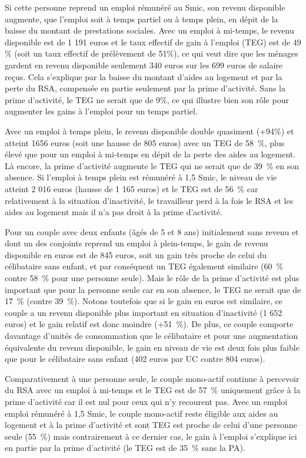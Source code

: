 \documentclass[
  french,
]{article}
\begin{document}
Si cette personne reprend un emploi rémunéré au Smic, son revenu
disponible augmente, que l'emploi soit à temps partiel ou à temps plein,
en dépit de la baisse du montant de prestations sociales. Avec un emploi
à mi-temps, le revenu disponible est de 1 191 euros et le taux effectif
de gain à l'emploi (TEG) est de 49 \% (soit un taux effectif de
prélèvement de 51\%), ce qui veut dire que les ménages gardent en revenu
disponible seulement 340 euros sur les 699 euros de salaire reçus. Cela
s'explique par la baisse du montant d'aides au logement et par la perte
du RSA, compensée en partie seulement par la prime d'activité. Sans la
prime d'activité, le TEG ne serait que de 9\%, ce qui illustre bien son
rôle pour augmenter les gains à l'emploi pour un temps partiel.

Avec un emploi à temps plein, le revenu disponible double quasiment
(+94\%) et atteint 1656 euros (soit une hausse de 805 euros) avec un TEG
de 58~\%, plus élevé que pour un emploi à mi-temps en dépit de la perte
des aides au logement. Là encore, la prime d'activité augmente le TEG
qui ne serait que de 39~\% en son absence. Si l'emploi à temps plein est
rémunéré à 1,5 Smic, le niveau de vie atteint 2 016 euros (hausse de 1
165 euros) et le TEG est de 56~\% car relativement à la situation
d'inactivité, le travailleur perd à la fois le RSA et les aides au
logement mais il n'a pas droit à la prime d'activité.

Pour un couple avec deux enfants (âgés de 5 et 8 ans) initialement sans
revenu et dont un des conjoints reprend un emploi à plein-temps, le gain
de revenu disponible en euros est de 845 euros, soit un gain très proche
de celui du célibataire sans enfant, et par conséquent un TEG également
similaire (60~\% contre 58~\% pour une personne seule). Mais le rôle de
la prime d'activité est plus important que pour la personne seule car en
son absence, le TEG ne serait que de 17~\% (contre 39~\%). Notons
toutefois que si le gain en euros est similaire, ce couple a un revenu
disponible plus important en situation d'inactivité (1 652 euros) et le
gain relatif est donc moindre (+51~\%). De plus, ce couple comporte
davantage d'unités de consommation que le célibataire et pour une
augmentation équivalente du revenu disponible, le gain en niveau de vie
est deux fois plus faible que pour le célibataire sans enfant (402 euros
par UC contre 804 euros).

Comparativement à une personne seule, le couple mono-actif continue à
percevoir du RSA avec un emploi à mi-temps et le TEG est de 57~\%
uniquement grâce à la prime d'activité car il est nul pour ceux qui n'y
recourent pas. Avec un emploi emploi rémunéré à 1,5 Smic, le couple
mono-actif reste éligible aux aides au logement et à la prime d'activité
et sont TEG est proche de celui d'une personne seule (55~\%) mais
contrairement à ce dernier cas, le gain à l'emploi s'explique ici en
partie par la prime d'activité (le TEG est de 35~\% sans la PA).
\end{document}
